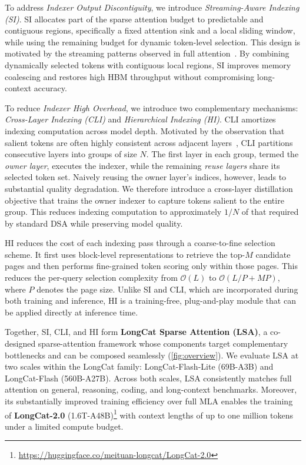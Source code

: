 \documentclass{article}
\begin{document}
To address \emph{Indexer Output Discontiguity}, we introduce \emph{Streaming-Aware Indexing (SI)}. SI allocates part of the sparse attention budget to predictable and contiguous regions, specifically a fixed attention sink and a local sliding window, while using the remaining budget for dynamic token-level selection. This design is motivated by the streaming patterns observed in full attention~\citep{xiao2023streamingllm,xiao2024duoattention}. By combining dynamically selected tokens with contiguous local regions, SI improves memory coalescing and restores high HBM throughput without compromising long-context accuracy.

To reduce \emph{Indexer High Overhead}, we introduce two complementary mechanisms: \emph{Cross-Layer Indexing (CLI)} and \emph{Hierarchical Indexing (HI)}. CLI amortizes indexing computation across model depth. Motivated by the observation that salient tokens are often highly consistent across adjacent layers~\citep{yang2024tidaldecode,deshmukh2025kascade,gao2026hysparse}, CLI partitions consecutive layers into groups of size $N$. The first layer in each group, termed the \emph{owner layer}, executes the indexer, while the remaining \emph{reuse layers} share its selected token set. Naively reusing the owner layer's indices, however, leads to substantial quality degradation. We therefore introduce a cross-layer distillation objective that trains the owner indexer to capture tokens salient to the entire group. This reduces indexing computation to approximately $1/N$ of that required by standard DSA while preserving model quality.

HI reduces the cost of each indexing pass through a coarse-to-fine selection scheme. It first uses block-level representations to retrieve the top-$M$ candidate pages and then performs fine-grained token scoring only within those pages. This reduces the per-query selection complexity from $\mathcal{O}(L)$ to $\mathcal{O}(L/P + MP)$, where $P$ denotes the page size. Unlike SI and CLI, which are incorporated during both training and inference, HI is a training-free, plug-and-play module that can be applied directly at inference time.

Together, SI, CLI, and HI form \textbf{LongCat Sparse Attention (LSA)}, a co-designed sparse-attention framework whose components target complementary bottlenecks and can be composed seamlessly (\cref{fig:overview}). We evaluate LSA at two scales within the LongCat family: LongCat-Flash-Lite (69B-A3B) and LongCat-Flash (560B-A27B). Across both scales, LSA consistently matches full attention on general, reasoning, coding, and long-context benchmarks. Moreover, its substantially improved training efficiency over full MLA enables the training of \textbf{LongCat-2.0} (1.6T-A48B)\footnote{\url{https://huggingface.co/meituan-longcat/LongCat-2.0}} with context lengths of up to one million tokens under a limited compute budget.
\end{document}
